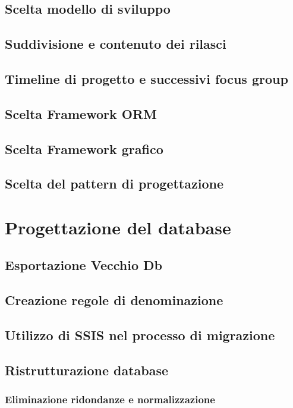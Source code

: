 \documentclass[12pt, a4paper]{article}
\begin{document}
\subsection{Scelta modello di sviluppo}
\subsection{Suddivisione e contenuto dei rilasci}
\subsection{Timeline di progetto e successivi focus group}
\subsection{Scelta Framework ORM}
\subsection{Scelta Framework grafico} %
\subsection{Scelta del pattern di progettazione} %

\newpage
\section{Progettazione del database}
\subsection{Esportazione Vecchio Db}
\subsection{Creazione regole di denominazione}
\subsection{Utilizzo di SSIS nel processo di migrazione}

\subsection{Ristrutturazione database}
\subsubsection{Eliminazione ridondanze e normalizzazione}
\end{document}
